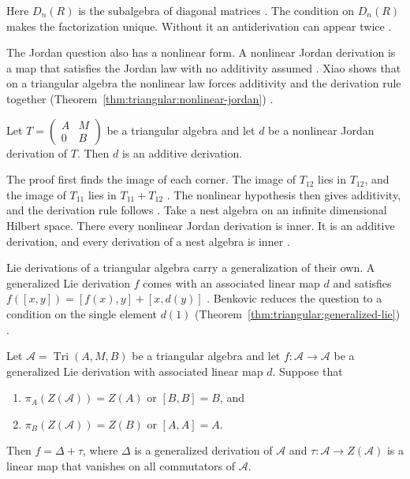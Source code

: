 Here $D_n(R)$ is the subalgebra of diagonal matrices
\cite[p.~356]{MaJi2007}. The condition on $D_n(R)$ makes the factorization
unique. Without it an antiderivation can appear twice
\cite[p.~362]{MaJi2007}.

The Jordan question also has a nonlinear form. A nonlinear Jordan derivation is
a map that satisfies the Jordan law with no additivity assumed
\cite[p.~1]{Xiao2012}. Xiao shows that on a triangular algebra the nonlinear law
forces additivity and the derivation rule together (Theorem~\ref{thm:triangular:nonlinear-jordan})
\cite[Theorem~2.1, p.~2]{Xiao2012}.\begin{theorem}\label{thm:triangular:nonlinear-jordan}
Let $T=\begin{pmatrix}A&M\\0&B\end{pmatrix}$ be a triangular algebra and let $d$
be a nonlinear Jordan derivation of $T$. Then $d$ is an additive derivation.
\end{theorem}

The proof first finds the image of each corner. The image of $T_{12}$ lies in
$T_{12}$, and the image of $T_{11}$ lies in $T_{11}+T_{12}$
\cite[Lemmas~2.2--2.3, p.~2]{Xiao2012}. The nonlinear hypothesis then gives
additivity, and the derivation rule follows \cite[pp.~2--7]{Xiao2012}. Take a
nest algebra on an infinite dimensional Hilbert space. There every nonlinear
Jordan derivation is inner. It is an additive derivation, and every derivation
of a nest algebra is inner \cite[Proposition~2.11, p.~7]{Xiao2012}.

Lie derivations of a triangular algebra carry a generalization of their own. A
generalized Lie derivation $f$ comes with an associated linear map $d$ and
satisfies $f([x,y])=[f(x),y]+[x,d(y)]$ \cite[p.~1535]{Benkovic2011GenLie}.
Benkovic reduces the question to a condition on the single element $d(1)$ (Theorem~\ref{thm:triangular:generalized-lie})
\cite[p.~1539]{Benkovic2011GenLie}.\begin{theorem}\label{thm:triangular:generalized-lie}
Let $\mathcal{A}=\operatorname{Tri}(A,M,B)$ be a triangular algebra and let
$f\colon\mathcal{A}\to\mathcal{A}$ be a generalized Lie derivation with
associated linear map $d$. Suppose that
\begin{enumerate}
\item $\pi_A(Z(\mathcal{A}))=Z(A)$ or $[B,B]=B$, and
\item $\pi_B(Z(\mathcal{A}))=Z(B)$ or $[A,A]=A$.
\end{enumerate}
Then $f=\Delta+\tau$, where $\Delta$ is a generalized derivation of
$\mathcal{A}$ and $\tau\colon\mathcal{A}\to Z(\mathcal{A})$ is a linear map
that vanishes on all commutators of $\mathcal{A}$.
\end{theorem}


